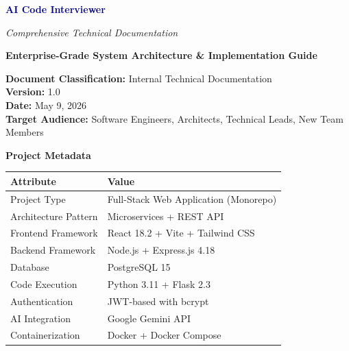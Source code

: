 \documentclass[12pt,a4paper,oneside]{article}
\begin{document}

\thispagestyle{empty}
\begin{center}
    \vspace*{2cm}
    
    {\huge \textbf{\textcolor{darkblue}{AI Code Interviewer}}}
    
    \vspace{0.5cm}
    
    {\Large \textit{Comprehensive Technical Documentation}}
    
    \vspace{1.5cm}
    
    {\large \textbf{Enterprise-Grade System Architecture \& Implementation Guide}}
    
    \vspace{2cm}
    
    \begin{mdframed}[backgroundcolor=lightblue, bordercolor=darkblue, linewidth=2pt]
        \textbf{Document Classification:} Internal Technical Documentation \\
        \textbf{Version:} 1.0 \\
        \textbf{Date:} May 9, 2026 \\
        \textbf{Target Audience:} Software Engineers, Architects, Technical Leads, New Team Members
    \end{mdframed}
    
    \vspace{2cm}
    
    {\Large \textbf{Project Metadata}}
    
    \begin{tabular}{p{4cm}p{8cm}}
        \toprule
        \textbf{Attribute} & \textbf{Value} \\
        \midrule
        Project Type & Full-Stack Web Application (Monorepo) \\
        Architecture Pattern & Microservices + REST API \\
        Frontend Framework & React 18.2 + Vite + Tailwind CSS \\
        Backend Framework & Node.js + Express.js 4.18 \\
        Database & PostgreSQL 15 \\
        Code Execution & Python 3.11 + Flask 2.3 \\
        Authentication & JWT-based with bcrypt \\
        AI Integration & Google Gemini API \\
        Containerization & Docker + Docker Compose \\
        \bottomrule
    \end{tabular}
    

\end{center}
\end{document}
